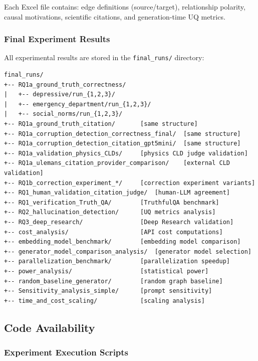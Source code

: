 Each Excel file contains: edge definitions (source/target), relationship polarity, causal motivations, scientific citations, and generation-time UQ metrics.

\subsubsection{Final Experiment Results}

All experimental results are stored in the \texttt{final\_runs/} directory:

\begin{verbatim}
final_runs/
+-- RQ1a_ground_truth_correctness/
|   +-- depressive/run_{1,2,3}/
|   +-- emergency_department/run_{1,2,3}/
|   +-- social_norms/run_{1,2,3}/
+-- RQ1a_ground_truth_citation/       [same structure]
+-- RQ1a_corruption_detection_correctness_final/  [same structure]
+-- RQ1a_corruption_detection_citation_gpt5mini/  [same structure]
+-- RQ1a_validation_physics_CLDs/     [physics CLD judge validation]
+-- RQ1a_ulemans_citation_provider_comparison/    [external CLD validation]
+-- RQ1b_correction_experiment_*/     [correction experiment variants]
+-- RQ1_human_validation_citation_judge/  [human-LLM agreement]
+-- RQ1_verification_Truth_QA/        [TruthfulQA benchmark]
+-- RQ2_hallucination_detection/      [UQ metrics analysis]
+-- RQ3_deep_research/                [Deep Research validation]
+-- cost_analysis/                    [API cost computations]
+-- embedding_model_benchmark/        [embedding model comparison]
+-- generator_model_comparison_analysis/  [generator model selection]
+-- parallelization_benchmark/        [parallelization speedup]
+-- power_analysis/                   [statistical power]
+-- random_baseline_generator/        [random graph baseline]
+-- Sensitivity_analysis_simple/      [prompt sensitivity]
+-- time_and_cost_scaling/            [scaling analysis]
\end{verbatim}

\subsection{Code Availability}
\label{sec:code_availability}

\subsubsection{Experiment Execution Scripts}

